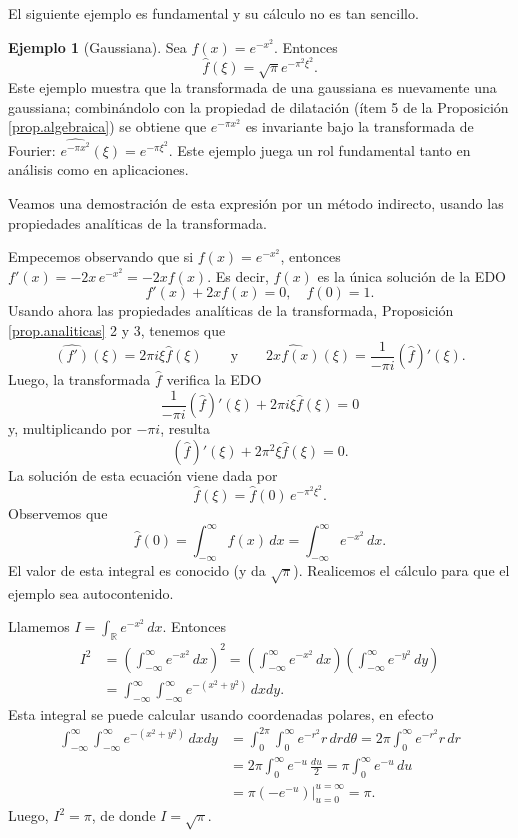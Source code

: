 \documentclass[12pt, a4paper]{amsbook}
\newcommand{\R}{{\mathbb R}}
\theoremstyle{remark}
\theoremstyle{definition}
\newtheorem{ejem}[teo]{Ejemplo}
\numberwithin{section}{chapter}
\numberwithin{subsection}{section}
\numberwithin{equation}{section}
\numberwithin{figure}{chapter}
\begin{document}
El siguiente ejemplo es fundamental y su cálculo no es tan sencillo.
\begin{ejem}[Gaussiana]\label{ej:gaussiana}
Sea $f(x)=e^{-x^2}$. Entonces
\[
\hat f(\xi)=\sqrt{\pi}e^{-\pi^2 \xi^2}.
\]
Este ejemplo muestra que la transformada de una gaussiana es nuevamente una gaussiana; combinándolo con la propiedad de dilatación (ítem 5 de la Proposición \ref{prop.algebraica}) se obtiene que $e^{-\pi x^2}$ es invariante bajo la transformada de Fourier: $\widehat{e^{-\pi x^2}}(\xi) = e^{-\pi\xi^2}$. Este ejemplo juega un rol fundamental tanto en análisis como en aplicaciones.

Veamos una demostración de esta expresión por un método indirecto, usando las propiedades analíticas de la transformada.

Empecemos observando que si $f(x)=e^{-x^2}$, entonces $f'(x) = -2x\, e^{-x^2} = -2xf(x)$. Es decir, $f(x)$ es la única solución de la EDO
$$
f'(x) + 2x f(x) = 0,\quad f(0)=1.
$$
Usando ahora las propiedades analíticas de la transformada, Proposición \ref{prop.analiticas} 2 y 3, tenemos que
$$
\widehat{(f')}(\xi) = 2\pi i\xi \hat f(\xi) \qquad \text{y}\qquad \widehat{2xf(x)}(\xi) = \frac{1}{-\pi i}(\hat f)'(\xi).
$$
Luego, la transformada $\hat f$ verifica la EDO
$$
\frac{1}{-\pi i}(\hat f)'(\xi) + 2\pi i\xi \hat f(\xi) = 0
$$
y, multiplicando por $-\pi i$, resulta
$$
(\hat f)'(\xi) + 2\pi^2\xi \hat f(\xi) = 0.
$$
La solución de esta ecuación viene dada por
$$
\hat f(\xi) = \hat f(0)\, e^{-\pi^2 \xi^2}.
$$
Observemos que 
$$
\hat f(0) = \int_{-\infty}^\infty f(x)\, dx = \int_{-\infty}^\infty e^{-x^2}\, dx.
$$
El valor de esta integral es conocido (y da $\sqrt{\pi}$). Realicemos el cálculo para que el ejemplo sea autocontenido.

Llamemos $I=\int_\R e^{-x^2}\, dx$. Entonces
\begin{align*}
I^2 &= \left(\int_{-\infty}^\infty e^{-x^2}\, dx\right)^2 = \left(\int_{-\infty}^\infty e^{-x^2}\, dx\right)\left(\int_{-\infty}^\infty e^{-y^2}\, dy\right)\\
&= \int_{-\infty}^\infty\int_{-\infty}^\infty e^{-(x^2+y^2)}\, dxdy.
\end{align*}
Esta integral se puede calcular usando coordenadas polares, en efecto
\begin{align*}
\int_{-\infty}^\infty\int_{-\infty}^\infty e^{-(x^2+y^2)}\, dxdy &= \int_0^{2\pi}\int_0^\infty e^{-r^2} r\, drd\theta = 2\pi\int_0^\infty e^{-r^2} r\, dr\\
&= 2\pi\int_0^\infty e^{-u}\, \frac{du}{2} = \pi\int_0^\infty e^{-u}\, du\\
&= \pi (-e^{-u})|_{u=0}^{u=\infty} = \pi.
\end{align*}
Luego, $I^2=\pi$, de donde $I=\sqrt{\pi}$.
\end{ejem}
\end{document}
